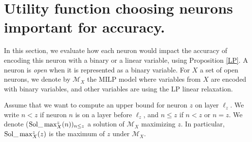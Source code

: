 \section{Utility function choosing neurons important for accuracy.}

\label{sec4}

In this section, we evaluate how each neuron would impact the accuracy of encoding this neuron with a binary or a linear variable, using Proposition \ref{LP}. A neuron is {\em open} when it is represented as a binary variable. For $X$ a set of open neurons, we denote by $\mathcal{M}_X$ the MILP model where variables from $X$ are encoded with binary variables, and other variables are using the LP linear relaxation.

Assume that we want to compute an upper bound for neuron $z$ on layer $\ell_z$.
We write $n < z$ if neuron {\color{blue} $n$ is} on a layer before $\ell_z$, and $n \leq z$ if $n< z$ or $n=z$. We denote ($\mathrm{Sol}\_\max_X^z(n))_{n \leq z}$ a solution of $\mathcal{M}_X$ maximizing $z$. In particular, $\mathrm{Sol}\_\max_X^z(z)$ is the maximum of $z$ under $\mathcal{M}_X$.

